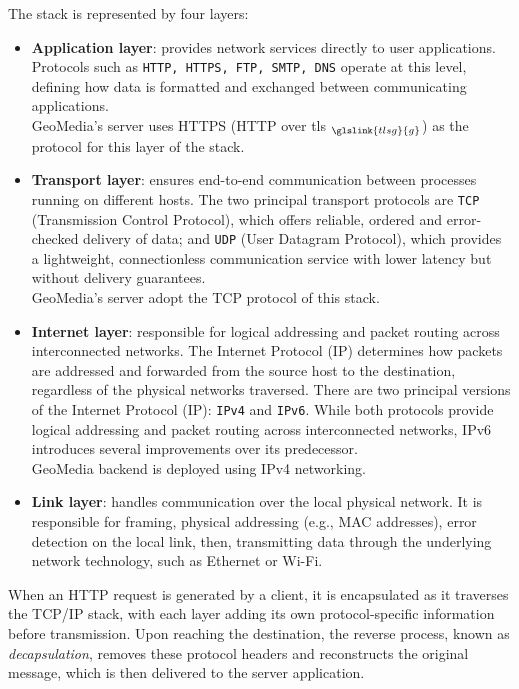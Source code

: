 The stack is represented by four layers:

\begin{itemize}
    \item \textbf{Application layer}: provides network services directly to user applications. Protocols such as \texttt{HTTP, HTTPS, FTP, SMTP, DNS} operate at this level, defining how data is formatted and exchanged between communicating applications. \\
    GeoMedia's server uses HTTPS (HTTP over \acrshort{tls} $_{\glslink{tlsg}{g}}$) as the protocol for this layer of the stack.

    \item \textbf{Transport layer}: ensures end-to-end communication between processes running on different hosts. The two principal transport protocols are \texttt{TCP} (Transmission Control Protocol), which offers reliable, ordered and error-checked delivery of data; and \texttt{UDP} (User Datagram Protocol), which provides a lightweight, connectionless communication service with lower latency but without delivery guarantees. \\
    GeoMedia's server adopt the TCP protocol of this stack.

    \item \textbf{Internet layer}: responsible for logical addressing and packet routing across interconnected networks. The Internet Protocol (IP) determines how packets are addressed and forwarded from the source host to the destination, regardless of the physical networks traversed. There are two principal versions of the Internet Protocol (IP): \texttt{IPv4} and \texttt{IPv6}. While both protocols provide logical addressing and packet routing across interconnected networks, IPv6 introduces several improvements over its predecessor.\\
    GeoMedia backend is deployed using IPv4 networking.

    \item \textbf{Link layer}: handles communication over the local physical network. It is responsible for framing, physical addressing (e.g., MAC addresses), error detection on the local link, then, transmitting data through the underlying network technology, such as Ethernet or Wi-Fi.

\end{itemize}

When an HTTP request is generated by a client, it is encapsulated as it traverses the TCP/IP stack, with each layer adding its own protocol-specific information before transmission. Upon reaching the destination, the reverse process, known as \emph{decapsulation}, removes these protocol headers and reconstructs the original message, which is then delivered to the server application.

